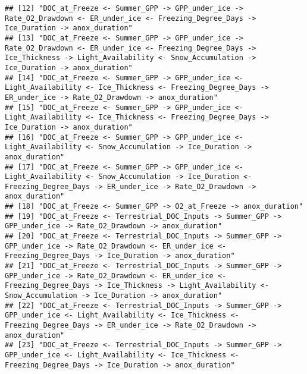 \documentclass[
]{article}
\begin{document}
\begin{verbatim}
## [12] "DOC_at_Freeze <- Summer_GPP -> GPP_under_ice -> Rate_O2_Drawdown <- ER_under_ice <- Freezing_Degree_Days -> Ice_Duration -> anox_duration"                                                                                      
## [13] "DOC_at_Freeze <- Summer_GPP -> GPP_under_ice -> Rate_O2_Drawdown <- ER_under_ice <- Freezing_Degree_Days -> Ice_Thickness -> Light_Availability <- Snow_Accumulation -> Ice_Duration -> anox_duration"                          
## [14] "DOC_at_Freeze <- Summer_GPP -> GPP_under_ice <- Light_Availability <- Ice_Thickness <- Freezing_Degree_Days -> ER_under_ice -> Rate_O2_Drawdown -> anox_duration"                                                               
## [15] "DOC_at_Freeze <- Summer_GPP -> GPP_under_ice <- Light_Availability <- Ice_Thickness <- Freezing_Degree_Days -> Ice_Duration -> anox_duration"                                                                                   
## [16] "DOC_at_Freeze <- Summer_GPP -> GPP_under_ice <- Light_Availability <- Snow_Accumulation -> Ice_Duration -> anox_duration"                                                                                                       
## [17] "DOC_at_Freeze <- Summer_GPP -> GPP_under_ice <- Light_Availability <- Snow_Accumulation -> Ice_Duration <- Freezing_Degree_Days -> ER_under_ice -> Rate_O2_Drawdown -> anox_duration"                                           
## [18] "DOC_at_Freeze <- Summer_GPP -> O2_at_Freeze -> anox_duration"                                                                                                                                                                   
## [19] "DOC_at_Freeze <- Terrestrial_DOC_Inputs -> Summer_GPP -> GPP_under_ice -> Rate_O2_Drawdown -> anox_duration"                                                                                                                    
## [20] "DOC_at_Freeze <- Terrestrial_DOC_Inputs -> Summer_GPP -> GPP_under_ice -> Rate_O2_Drawdown <- ER_under_ice <- Freezing_Degree_Days -> Ice_Duration -> anox_duration"                                                            
## [21] "DOC_at_Freeze <- Terrestrial_DOC_Inputs -> Summer_GPP -> GPP_under_ice -> Rate_O2_Drawdown <- ER_under_ice <- Freezing_Degree_Days -> Ice_Thickness -> Light_Availability <- Snow_Accumulation -> Ice_Duration -> anox_duration"
## [22] "DOC_at_Freeze <- Terrestrial_DOC_Inputs -> Summer_GPP -> GPP_under_ice <- Light_Availability <- Ice_Thickness <- Freezing_Degree_Days -> ER_under_ice -> Rate_O2_Drawdown -> anox_duration"                                     
## [23] "DOC_at_Freeze <- Terrestrial_DOC_Inputs -> Summer_GPP -> GPP_under_ice <- Light_Availability <- Ice_Thickness <- Freezing_Degree_Days -> Ice_Duration -> anox_duration"                                                         

\end{verbatim}
\end{document}
